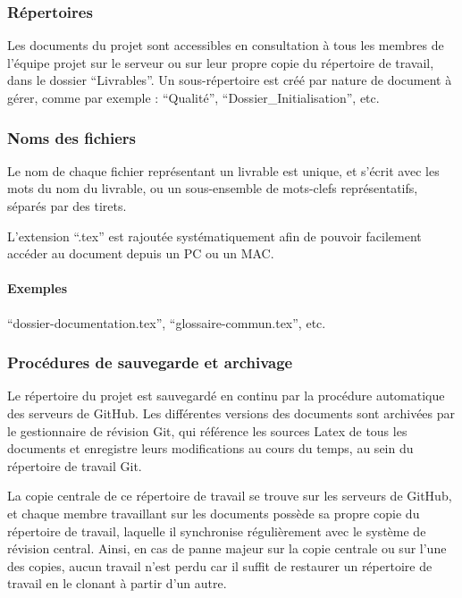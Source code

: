 \documentclass[a4paper]{article}
\begin{document}
\subsubsection{Répertoires}

Les documents du projet sont accessibles en consultation à tous les membres de l'équipe projet sur le serveur ou sur leur propre copie du répertoire de travail, dans le dossier ``Livrables''. Un sous-répertoire est créé par nature de document à gérer, comme par exemple : ``Qualité'', ``Dossier\_Initialisation'', etc.

\subsubsection{Noms des fichiers}

Le nom de chaque fichier représentant un livrable est unique, et s'écrit avec les mots du nom du livrable, ou un sous-ensemble de mots-clefs représentatifs, séparés par des tirets.

L'extension ``.tex'' est rajoutée systématiquement afin de pouvoir facilement accéder au document depuis un PC ou un MAC.

\paragraph{Exemples} ``dossier-documentation.tex'', ``glossaire-commun.tex'', etc.

\subsubsection{Procédures de sauvegarde et archivage}

Le répertoire du projet est sauvegardé en continu par la procédure automatique des serveurs de GitHub. Les différentes versions des documents sont archivées par le gestionnaire de révision Git, qui référence les sources Latex de tous les documents et enregistre leurs modifications au cours du temps, au sein du répertoire de travail Git.

La copie centrale de ce répertoire de travail se trouve sur les serveurs de GitHub, et chaque membre travaillant sur les documents possède sa propre copie du répertoire de travail, laquelle il synchronise régulièrement avec le système de révision central. Ainsi, en cas de panne majeur sur la copie centrale ou sur l'une des copies, aucun travail n'est perdu car il suffit de restaurer un répertoire de travail en le clonant à partir d'un autre.
\end{document}
